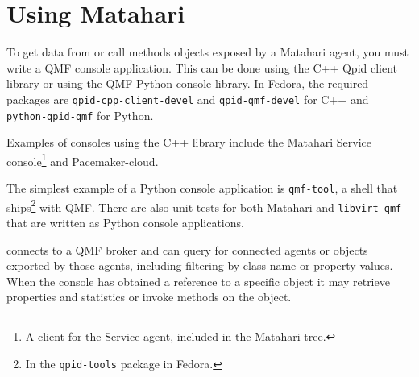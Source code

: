 \section{Using Matahari}

To get data from or call methods objects exposed by a Matahari agent, you must write a QMF console application. This can be done using the C++ Qpid client library or using the QMF Python console library. In Fedora, the required packages are \texttt{qpid-cpp-client-devel} and \texttt{qpid-qmf-devel} for C++ and \texttt{python-qpid-qmf} for Python.

Examples of consoles using the C++ library include the Matahari Service console\footnote{A client for the Service agent, included in the Matahari tree.} and Pacemaker-cloud.

The simplest example of a Python console application is \texttt{qmf-tool}, a shell that ships\footnote{In the \texttt{qpid-tools} package in Fedora.} with QMF. There are also unit tests for both Matahari and \texttt{libvirt-qmf} that are written as Python console applications.

 connects to a QMF broker and can query for connected agents or objects exported by those agents, including filtering by class name or property values. When the console has obtained a reference to a specific object it may retrieve properties and statistics or invoke methods on the object.
